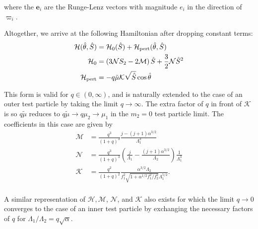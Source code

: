 \documentclass[usenatbib,onecolumn]{mnras}
\begin{document}
\noindent
where the \(\mathbf{e}_i\) are the Runge-Lenz vectors with magnitude
\(e_i\) in the direction of \(\varpi_i\).  

Altogether, we arrive at the following Hamiltonian after
dropping constant terms:
\begin{align}
  \label{eq:HShat}\mathcal H(\hat \theta, \hat S) &= \mathcal H_0(\hat S) + \mathcal H_{\rm pert}(\hat \theta, \hat S) \\
  \mathcal H_0
  &= \left( 3\mathcal NS_2 -2\mathcal M\right) \hat S
    + \frac32 \mathcal N \hat S^2 \\
  \mathcal H_{\rm pert}
  &= - q\tilde\mu\mathcal K\sqrt{\hat S}\cos\hat\theta
\end{align}

\noindent This form is valid for \(q\in (0,\infty)\), and is
naturally extended to the case of an outer test particle by taking the
limit \(q\to\infty\).  The extra factor of \(q\) in front of \(\mathcal K\)
is so \(q\tilde\mu\) reduces to \(q\tilde\mu\to q\mu_2 \to \mu_1\) in the
\(m_2=0\) test particle limit.  The coefficients in this case are given
by
\begin{align}
  \mathcal M
  &= \frac{q^3}{(1+q)^3}\frac{j-(j+1)\alpha^{3/2}}{\Lambda_1^3}\\
  \mathcal N
  &= \frac{q^3}{(1+q)^3}\left(
    \frac{j}{\Lambda_1} - \frac{(j+1)\alpha^{3/2}}{\Lambda_2}
    \right)\frac{1}{\Lambda_1^3}\\
  \mathcal K
  &= \frac{q^2}{(1+q)^2}
    \frac{\alpha^{3/2}\Lambda_2}{f_1^2\sqrt{1+\alpha^{1/2}f_1^2/f_2^2}\Lambda_1^{5/2}}.\\
\end{align}

A similar representation of \(\mathcal H, \mathcal M\), \(\mathcal N\),
and \(\mathcal{K}\) also exists for which the limit \(q\to 0\) converges
to the case of an inner test particle by exchanging the necessary
factors of \(q\) for \(\Lambda_1/\Lambda_2 = q\sqrt\alpha\).
\end{document}
